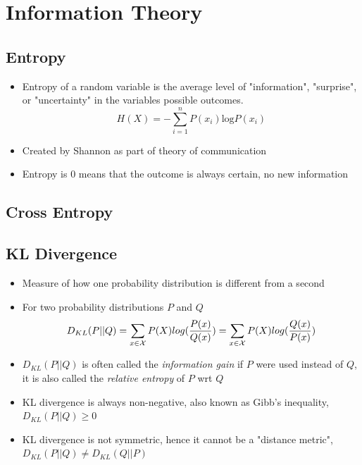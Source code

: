 \documentclass[../main.tex]{subfiles}
\begin{document}
\section{Information Theory}
\subsection{Entropy}
  \begin{itemize}
    \item Entropy of a random variable is the average level of "information", "surprise", or "uncertainty" in the variables possible outcomes.
    \begin{equation*}
      H(X) = -\sum_{i=1}^{n} P(x_{i})\text{log}{P(x_{i})}
    \end{equation*}
    \item Created by Shannon as part of theory of communication
    \item Entropy is 0 means that the outcome is always certain, no new information
  \end{itemize}
\label{sub:entropy}

\subsection{Cross Entropy} %
\label{sub:cross_entropy}


\subsection{KL Divergence} %
\label{sub:kl_divergence}
  \begin{itemize}
    \item Measure of how one probability distribution is different from a second
    \item For two probability distributions $P$ and $Q$
    \begin{equation*}
      D_{KL}(P||Q) = \sum_{x \in \mathcal{X}} P(X) log(\frac{P(x)}{Q(x)}) = \sum_{x \in \mathcal{X}} P(X) log(\frac{Q(x)}{P(x)})
    \end{equation*}
    \item $D_{KL}(P||Q)$ is often called the \textit{information gain} if $P$ were used instead of $Q$, it is also called the \textit{relative entropy} of $P$ wrt $Q$
    \item KL divergence is always non-negative, also known as Gibb's inequality, $D_{KL}(P||Q) \geq 0$
    \item KL divergence is not symmetric, hence it cannot be a "distance metric", $D_{KL}(P||Q) \neq D_{KL}(Q||P)$
  \end{itemize}
\end{document}
